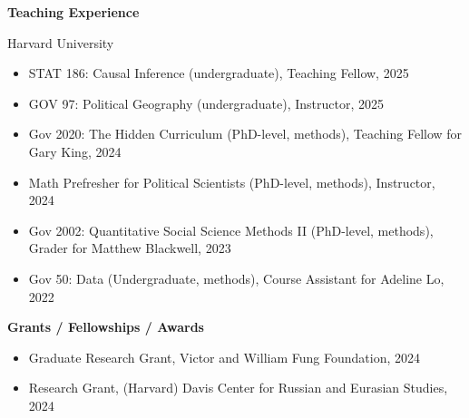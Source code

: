 \documentclass[12pt]{article}
\begin{document}
\begin{footnotesize}
\begin{itemize}
\end{itemize}

\vspace{5mm} 






{\bf {\normalsize Teaching Experience}}

\vspace{3mm} 

Harvard University

\vspace{1.5mm} 

\begin{itemize}[noitemsep,nolistsep]

\item STAT 186: Causal Inference (undergraduate), Teaching Fellow, 2025

\item GOV 97: Political Geography (undergraduate), Instructor, 2025

\item Gov 2020: The Hidden Curriculum (PhD-level, methods), Teaching Fellow for Gary King, 2024

\item Math Prefresher for Political Scientists (PhD-level, methods), Instructor, 2024

\item Gov 2002: Quantitative Social Science Methods II (PhD-level, methods), Grader for Matthew Blackwell, 2023

\item Gov 50: Data (Undergraduate, methods), Course Assistant for Adeline Lo, 2022

\end{itemize}

\vspace{5mm} 





{\bf {\normalsize Grants / Fellowships / Awards}}

\vspace{3mm} 

\vspace{1mm} 

\begin{itemize}[noitemsep,nolistsep]

\item Graduate Research Grant, Victor and William Fung Foundation, 2024

\item Research Grant, (Harvard) Davis Center for Russian and Eurasian Studies, 2024


\end{itemize}
\end{footnotesize}
\end{document}

